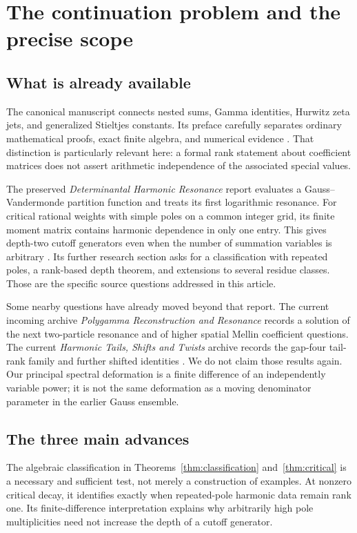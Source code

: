 \section{The continuation problem and the precise scope}
\label{sec:context}

\subsection{What is already available}
The canonical manuscript connects nested sums, Gamma identities, Hurwitz
zeta jets, and generalized Stieltjes constants. Its preface carefully
separates ordinary mathematical proofs, exact finite algebra, and numerical
evidence \cite{repo:main}. That distinction is particularly relevant here:
a formal rank statement about coefficient matrices does not assert
arithmetic independence of the associated special values.

The preserved \emph{Determinantal Harmonic Resonance} report evaluates a
Gauss--Vandermonde partition function and treats its first logarithmic
resonance. For critical rational weights with simple poles on a common
integer grid, its finite moment matrix contains harmonic dependence in
only one entry. This gives depth-two cutoff generators even when the
number of summation variables is arbitrary \cite{repo:dhr}. Its further
research section asks for a classification with repeated poles, a rank-based
depth theorem, and extensions to several residue classes. Those are the
specific source questions addressed in this article.

Some nearby questions have already moved beyond that report. The current
incoming archive \emph{Polygamma Reconstruction and Resonance} records a
solution of the next two-particle resonance and of higher spatial Mellin
coefficient questions. The current \emph{Harmonic Tails, Shifts and Twists}
archive records the gap-four tail-rank family and further shifted identities
\cite{repo:incoming}. We do not claim those results again. Our principal
spectral deformation is a finite difference of an independently variable
power; it is not the same deformation as a moving denominator parameter
in the earlier Gauss ensemble.

\subsection{The three main advances}
The algebraic classification in Theorems~\ref{thm:classification}
and~\ref{thm:critical} is a necessary and sufficient test, not merely a
construction of examples. At nonzero critical decay, it identifies exactly
when repeated-pole harmonic data remain rank one. Its finite-difference
interpretation explains why arbitrarily high pole multiplicities need not
increase the depth of a cutoff generator.

